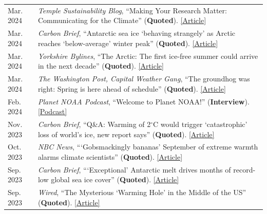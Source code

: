 \documentclass[margin,line,palatino,courier,10pt]{res}
\begin{document}
\begin{resume}
\begin{tabular}{@{}p{0.9in}p{4in}}
Mar. 2024 & \textit{Temple Sustainability Blog}, ``Making Your Research Matter: Communicating for the Climate'' (\textbf{Quoted}). \href{https://sites.temple.edu/tusustainability/2024/03/27/making-your-research-matter-communicating-for-the-climate/}{[Article]}\\
Mar. 2024 & \textit{Carbon Brief}, ``Antarctic sea ice `behaving strangely' as Arctic reaches `below-average' winter peak'' (\textbf{Quoted}). \href{https://www.carbonbrief.org/antarctic-sea-ice-behaving-strangely-as-arctic-reaches-below-average-winter-peak/}{[Article]}\\
Mar. 2024 & \textit{Yorkshire Bylines}, ``The Arctic: The first ice-free summer could arrive in the next decade'' (\textbf{Quoted}). \href{https://yorkshirebylines.co.uk/news/environment/the-arctic-the-first-ice-free-summer-could-arrive-in-the-next-decade/}{[Article]}\\
Mar. 2024 & \textit{The Washington Post, Capital Weather Gang}, ``The groundhog was right: Spring is here ahead of schedule'' (\textbf{Quoted}). \href{https://www.washingtonpost.com/weather/2024/03/02/spring-arriving-early-united-states/}{[Article]}\\
Feb. 2024 & \textit{Planet NOAA Podcast}, ``Welcome to Planet NOAA!'' (\textbf{Interview}). \href{https://www.noaa.gov/podcasts/planet-noaa-from-sun-to-sea-and-everything-in-between/welcome-to-planet-noaa}{[Podcast]}\\
Nov. 2023 & \textit{Carbon Brief}, ``Q\&A: Warming of 2$^{\circ}$C would trigger `catastrophic' loss of world’s ice, new report says'' (\textbf{Quoted}). \href{https://www.carbonbrief.org/qa-warming-of-2c-would-trigger-catastrophic-loss-of-worlds-ice-new-report-says/}{[Article]}\\
Oct. 2023 & \textit{NBC News}, ```Gobsmackingly bananas' September of extreme warmth alarms climate scientists'' (\textbf{Quoted}). \href{https://www.nbcnews.com/science/science-news/heat-september-extreme-warmth-climate-rcna118401}{[Article]}\\
Sep. 2023 & \textit{Carbon Brief}, ```Exceptional' Antarctic melt drives months of record-low global sea ice cover'' (\textbf{Quoted}). \href{https://www.carbonbrief.org/exceptional-antarctic-melt-drives-months-of-record-low-global-sea-ice-cover/}{[Article]}\\
Sep. 2023 & \textit{Wired}, ``The Mysterious `Warming Hole' in the Middle of the US'' (\textbf{Quoted}). \href{https://www.wired.com/story/the-mysterious-warming-hole-in-the-middle-of-the-us/}{[Article]}\\

\end{tabular}
\end{resume}
\end{document}
